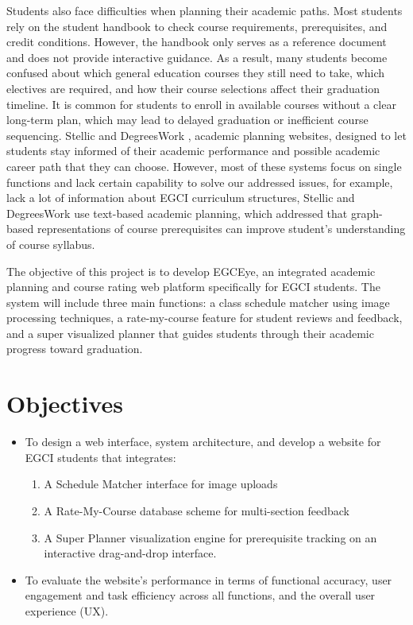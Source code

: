 \hspace{1.6 cm}Students also face difficulties when planning their academic paths. Most students rely on the student handbook to check course requirements, prerequisites, and credit conditions. However, the handbook only serves as a reference document and does not provide interactive guidance. As a result, many students become confused about which general education courses they still need to take, which electives are required, and how their course selections affect their graduation timeline. It is common for students to enroll in available courses without a clear long-term plan, which may lead to delayed graduation or inefficient course sequencing. Stellic and DegreesWork \cite{stellic} \cite{degreeworks}, academic planning websites, designed to let students stay informed of their academic performance and possible academic career path that they can choose.  However, most of these systems focus on single functions and lack certain capability to solve our addressed issues, for example, \cite{ratemyprofessors} lack a lot of information about EGCI curriculum structures, Stellic and DegreesWork \cite{stellic} \cite{degreeworks} use text-based academic planning, which \cite{trippel2025developing} addressed that graph-based representations of course prerequisites can improve student’s understanding of course syllabus.

\hspace{1.6 cm}The objective of this project is to develop EGCEye, an integrated academic planning and course rating web platform specifically for EGCI students. The system will include three main functions: a class schedule matcher using image processing techniques, a rate-my-course feature for student reviews and feedback, and a super visualized planner that guides students through their academic progress toward graduation.


\section{Objectives}
\begin{itemize}
	\item To design a web interface, system architecture, and develop a website for EGCI students that integrates:
	\begin{enumerate}[label=\alph*.]
	\item A Schedule Matcher interface for image uploads
	\item A Rate-My-Course database scheme for multi-section feedback
	\item A Super Planner visualization engine for prerequisite tracking on an interactive drag-and-drop interface.
	\end{enumerate}
	\item To evaluate the website’s performance in terms of functional accuracy, user engagement and task efficiency across all functions, and the overall user experience (UX).
	
\end{itemize}

